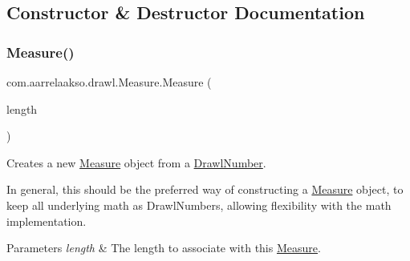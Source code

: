 \subsection{Constructor \& Destructor Documentation}
\mbox{\label{classcom_1_1aarrelaakso_1_1drawl_1_1_measure_a8de66af52cef5213749889357261110b}} 
\subsubsection{\texorpdfstring{Measure()}{Measure()}\hspace{0.1cm}{\footnotesize\ttfamily [1/2]}}
{\footnotesize\ttfamily com.\+aarrelaakso.\+drawl.\+Measure.\+Measure (\begin{DoxyParamCaption}\item[{\hyperlink{classcom_1_1aarrelaakso_1_1drawl_1_1_drawl_number}{Drawl\+Number}}]{length }\end{DoxyParamCaption})\hspace{0.3cm}{\ttfamily [protected]}}



Creates a new \hyperlink{classcom_1_1aarrelaakso_1_1drawl_1_1_measure}{Measure} object from a \hyperlink{classcom_1_1aarrelaakso_1_1drawl_1_1_drawl_number}{Drawl\+Number}. 

In general, this should be the preferred way of constructing a \hyperlink{classcom_1_1aarrelaakso_1_1drawl_1_1_measure}{Measure} object, to keep all underlying math as Drawl\+Numbers, allowing flexibility with the math implementation.


\begin{DoxyParams}{Parameters}
{\em length} & The length to associate with this \hyperlink{classcom_1_1aarrelaakso_1_1drawl_1_1_measure}{Measure}. \\
\hline
\end{DoxyParams}
\mbox{\label{classcom_1_1aarrelaakso_1_1drawl_1_1_measure_a1eb630b258eb8f181f7e0c96d2df7951}} 
